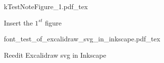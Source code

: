 \documentclass[12pt]{report}
\newcommand{\incfig}[1]{%
    \def\svgwidth{\columnwidth}
    {#1.pdf_tex}
}
\begin{document}

\begin{figure}[H]
    \centering
    \incfig{kTestNoteFigure_1}
    \caption{Insert the $1^{st}$ figure}
    \label{fig:kTestNoteFigure_1}
\end{figure}

\begin{figure}[H]
    \centering
    \incfig{font_test_of_excalidraw_svg_in_inkscape}
    \caption{Reedit Excalidraw svg in Inkscape}
    \label{fig:font_test_of_excalidraw_svg_in_inkscape}
\end{figure}

\end{document}
